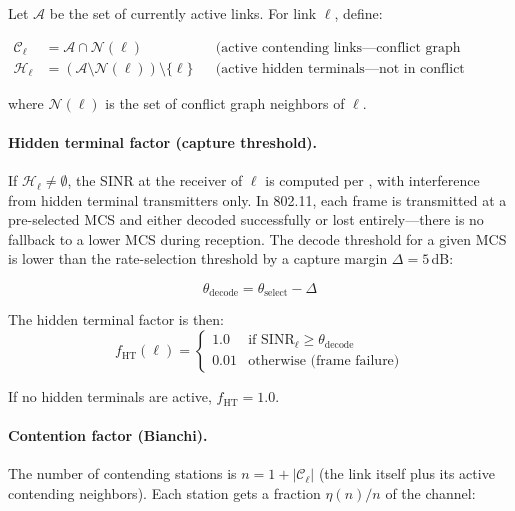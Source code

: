 \documentclass[11pt,letterpaper]{article}
\begin{document}
Let $\mathcal{A}$ be the set of currently active links.  For link $\ell$,
define:

\begin{align}
\mathcal{C}_\ell &= \mathcal{A} \cap \mathcal{N}(\ell)
  && \text{(active contending links---conflict graph neighbors)} \label{eq:contending} \\
\mathcal{H}_\ell &= (\mathcal{A} \setminus \mathcal{N}(\ell)) \setminus \{\ell\}
  && \text{(active hidden terminals---not in conflict graph)} \label{eq:hidden}
\end{align}

where $\mathcal{N}(\ell)$ is the set of conflict graph neighbors of $\ell$.

\paragraph{Hidden terminal factor (capture threshold).}
If $\mathcal{H}_\ell \neq \emptyset$, the SINR at the receiver of $\ell$ is
computed per , with interference from hidden terminal
transmitters only.  In 802.11, each frame is transmitted at a pre-selected
MCS and either decoded successfully or lost entirely---there is no fallback
to a lower MCS during reception.  The decode threshold for a given MCS is
lower than the rate-selection threshold by a capture margin $\Delta = 5$\,dB:

\begin{equation}
\theta_\text{decode} = \theta_\text{select} - \Delta
\end{equation}

The hidden terminal factor is then:
\begin{equation}
\label{eq:sinr_factor}
f_\text{HT}(\ell) = \begin{cases}
1.0 & \text{if } \text{SINR}_\ell \geq \theta_\text{decode} \\
0.01 & \text{otherwise (frame failure)}
\end{cases}
\end{equation}

If no hidden terminals are active, $f_\text{HT} = 1.0$.

\paragraph{Contention factor (Bianchi).}
The number of contending stations is $n = 1 + |\mathcal{C}_\ell|$ (the link
itself plus its active contending neighbors).  Each station gets a fraction
$\eta(n)/n$ of the channel:
\end{document}
